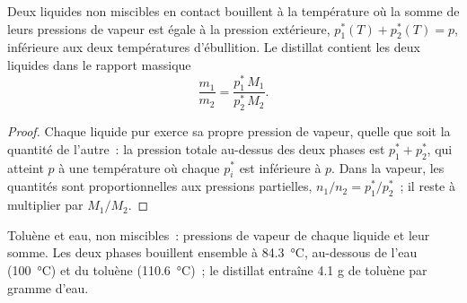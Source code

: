 \begin{proposition}\label{prop:b2:liquid-vapour-diagrams:steam}
Deux liquides non miscibles en contact bouillent à la température où la somme de
leurs pressions de vapeur est égale à la pression extérieure, $p_1^*(T) + p_2^*(T) =
p$, inférieure aux deux températures d'ébullition. Le distillat contient les deux liquides
dans le rapport massique
\[
  \frac{m_1}{m_2} = \frac{p_1^*\,M_1}{p_2^*\,M_2} .
\]
\end{proposition}

\begin{proof}
Chaque liquide pur exerce sa propre pression de vapeur, quelle que soit la quantité de
l'autre~: la pression totale au-dessus des deux phases est $p_1^* + p_2^*$, qui
atteint $p$ à une température où chaque $p_i^*$ est inférieure à $p$. Dans la
vapeur, les quantités sont proportionnelles aux pressions partielles, $n_1/n_2 =
p_1^*/p_2^*$~; il reste à multiplier par $M_1/M_2$.
\end{proof}

\begin{omfigure}

{\small Toluène et eau, non miscibles~: pressions de vapeur de chaque liquide et
leur somme. Les deux phases bouillent ensemble à \qty{84.3}{\degreeCelsius}, au-dessous
de l'eau (\qty{100}{\degreeCelsius}) et du toluène (\qty{110.6}{\degreeCelsius})~;
le distillat entraîne 4.1 g de toluène par gramme d'eau.}
\end{omfigure}

